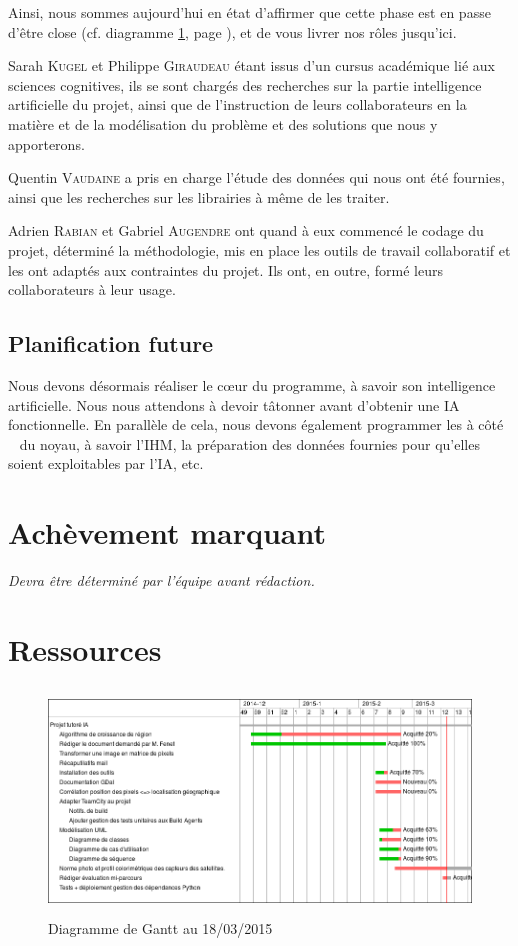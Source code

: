 \documentclass[a4paper, 12pt]{article}
\begin{document}
Ainsi, nous sommes aujourd'hui en état d'affirmer que cette phase est en passe d'être close (cf. diagramme \ref{gantt}, page \pageref{gantt}), et de vous livrer nos rôles jusqu'ici.

Sarah \textsc{Kugel} et Philippe \textsc{Giraudeau} étant issus d'un cursus académique lié aux sciences cognitives, ils se sont chargés des recherches sur la partie intelligence artificielle du projet, ainsi que de l'instruction de leurs collaborateurs en la matière et de la modélisation du problème et des solutions que nous y apporterons.

Quentin \textsc{Vaudaine} a pris en charge l'étude des données qui nous ont été fournies, ainsi que les recherches sur les librairies à même de les traiter.

Adrien \textsc{Rabian} et Gabriel \textsc{Augendre} ont quand à eux commencé le codage du projet, déterminé la méthodologie, mis en place les outils de travail collaboratif et les ont adaptés aux contraintes du projet. Ils ont, en outre, formé leurs collaborateurs à leur usage.

\subsection{Planification future}
Nous devons désormais réaliser le cœur du programme, à savoir son intelligence artificielle. Nous nous attendons à devoir tâtonner avant d'obtenir une IA fonctionnelle. En parallèle de cela, nous devons également programmer les \og à côté \fg ~ du noyau, à savoir l'IHM, la préparation des données fournies pour qu'elles soient exploitables par l'IA, etc.

\section{Achèvement marquant}
\textsl{Devra être déterminé par l'équipe avant rédaction.}

\newpage
\appendix
\section{Ressources}
	\begin{figure}
		\begin{center}
			\includegraphics[height=60mm]{gantt.png}
			\newline
			\caption{Diagramme de Gantt au 18/03/2015}
			\label{gantt}
		\end{center}
	\end{figure}
\end{document}
